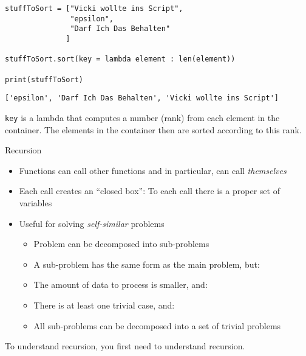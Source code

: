 
\begin{frame}[fragile]
%
\begin{codebox}
\begin{verbatim}
stuffToSort = ["Vicki wollte ins Script",
               "epsilon", 
               "Darf Ich Das Behalten"
              ]

stuffToSort.sort(key = lambda element : len(element))

print(stuffToSort)
\end{verbatim}
\end{codebox}
%
\begin{cmdbox}
\begin{verbatim}
['epsilon', 'Darf Ich Das Behalten', 'Vicki wollte ins Script']
\end{verbatim}
\end{cmdbox}
%
\begin{hintbox}
\texttt{key} is a lambda that computes a number (rank) from each element in the container. The elements in the container then are sorted according to this rank.
\end{hintbox}
%
\end{frame}


\begin{frame}{Recursion}
%
\begin{itemize}
\item Functions can call other functions and in particular, can call \emph{themselves}
\item Each call creates an \enquote{closed box}: To each call there is a proper set of variables
\item Useful for solving \emph{self-similar} problems
	\begin{itemize}
	\item Problem can be decomposed into sub-problems
	\item A sub-problem has the same form as the main problem, but:
	\item The amount of data to process is smaller, and:
	\item There is at least one trivial case, and:
	\item All sub-problems can be decomposed into a set of trivial problems
	\end{itemize}
\end{itemize}
%
\begin{hintbox}
To understand recursion, you first need to understand recursion.
\end{hintbox}
%
\end{frame}

